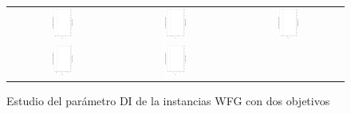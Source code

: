 \begin{figure}[h]
\centering
\caption{Estudio del parámetro DI de la instancias WFG con dos objetivos}
\label{fig:Scalability_Study_HV_1}
\begin{tabular}{ccc}
   \includegraphics[width=0.2\textwidth, angle=-90,origin=c]{Figures_Chapter7/Results_Chapter3/EPS_DI/2obj_WFG1.eps} &
   \includegraphics[width=0.2\textwidth, angle=-90,origin=c]{Figures_Chapter7/Results_Chapter3/EPS_DI/2obj_WFG2.eps} &
   \includegraphics[width=0.2\textwidth,angle=-90,origin=c]{Figures_Chapter7/Results_Chapter3/EPS_DI/2obj_WFG3.eps}  
    \\ 
   \includegraphics[width=0.2\textwidth, angle=-90,origin=c]{Figures_Chapter7/Results_Chapter3/EPS_DI/2obj_WFG4.eps} &
   \includegraphics[width=0.2\textwidth, angle=-90,origin=c]{Figures_Chapter7/Results_Chapter3/EPS_DI/2obj_WFG5.eps} &

\end{tabular}
\end{figure}
